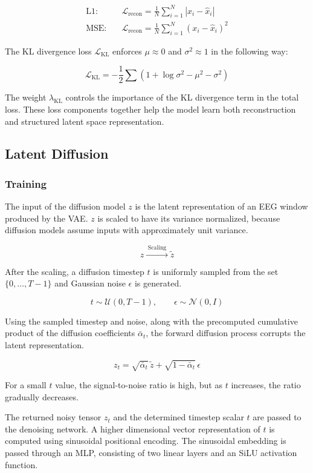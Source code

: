 \[
\begin{aligned}
\text{L1:} \quad & \mathcal{L}_{\text{recon}} = \frac{1}{N} \sum_{i=1}^{N} |x_i - \hat{x}_i| \\
\text{MSE:} \quad & \mathcal{L}_{\text{recon}} = \frac{1}{N} \sum_{i=1}^{N} (x_i - \hat{x}_i)^2
\end{aligned}
\]

The KL divergence loss $\mathcal{L}_{\text{KL}}$ enforces $\mu \approx 0$ and $\sigma^2 \approx 1$ in the following way:

\[
\mathcal{L}_{\mathrm{KL}} = -\frac{1}{2} \sum \left( 1 + \log \sigma^2 - \mu^2 - \sigma^2 \right)
\]

The weight $\lambda_{\text{KL}}$ controls the importance of the KL divergence term in the total loss. These loss components together help the model learn both reconstruction and structured latent space representation.

\subsection{Latent Diffusion}

\subsubsection{Training}

The input of the diffusion model $z$ is the latent representation of an EEG window produced by the VAE. $z$ is scaled to have its variance normalized, because diffusion models assume inputs with approximately unit variance. 

\[
z \xrightarrow{\;\text{Scaling}\;} \tilde{z}
\]

After the scaling, a diffusion timestep $t$ is uniformly sampled from the set $\{0, \dots, T-1\}$ and Gaussian noise $\epsilon$ is generated.

\[
t \sim \mathcal{U}(0, T-1), \qquad \epsilon \sim \mathcal{N}(0, I)
\]

Using the sampled timestep and noise, along with the precomputed cumulative product of the diffusion coefficients $\bar{\alpha}_t$, the forward diffusion process corrupts the latent representation. 

\[
z_t = \sqrt{\bar{\alpha}_t}\, \tilde z + \sqrt{1 - \bar{\alpha}_t}\, \epsilon
\]

For a small $t$ value, the signal-to-noise ratio is high, but as $t$ increases, the ratio gradually decreases. 

The returned noisy tensor $z_t$ and the determined timestep scalar $t$ are passed to the denoising network. A higher dimensional vector representation of $t$ is computed using sinusoidal positional encoding. The sinusoidal embedding is passed through an MLP, consisting of two linear layers and an SiLU activation function. 

